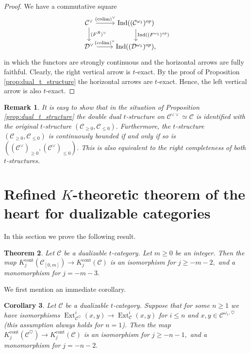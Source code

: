 \documentclass[11pt,leqno]{amsart}
\newtheorem{theo}{Theorem}[section]
\newtheorem{cor}[theo]{Corollary}
\newtheorem{remark}[theo]{Remark}
\numberwithin{equation}{section}
\DeclareMathOperator*{\colim}{colim}
\newcommand{\cont}{\operatorname{cont}}
\newcommand{\cD}{{\mathcal D}}
\newcommand{\cC}{{\mathcal C}}
\newcommand{\Ext}{\operatorname{Ext}}
\newcommand{\Ind}{\operatorname{Ind}}
\begin{document}
\begin{proof}
We have a commutative square
\begin{equation*}
\begin{tikzcd}
\cC^{\vee} \ar{r}{(\colim)^{\vee}}\ar[d, "(F^R)^{\vee}"] & \Ind((\cC^{\omega_1})^{op})\ar{d}{\Ind((F^{\omega_1})^{op})}\\
\cD^{\vee} \ar{r}{(\colim)^{\vee}} & \Ind((\cD^{\omega_1})^{op}),
\end{tikzcd}
\end{equation*}
in which the functors are strongly continuous and the horizontal arrows are fully faithful. Clearly, the right vertical arrow is $t$-exact. By the proof of Proposition \ref{prop:dual_t_structure} the horizontal arrows are $t$-exact. Hence, the left vertical arrow is also $t$-exact.
\end{proof}

\begin{remark}
It is easy to show that in the situation of Proposition \ref{prop:dual_t_structure} the double dual $t$-structure on $\cC^{\vee\vee}\simeq\cC$ is identified with the original $t$-structure $(\cC_{\geq 0},\cC_{\leq 0}).$ Furthermore, the $t$-structure $(\cC_{\geq 0},\cC_{\leq 0})$ is continuously bounded if and only if so is $((\cC^{\vee})_{\geq 0},(\cC^{\vee})_{\leq 0}).$ This is also equivalent to the right completeness of both $t$-structures.
\end{remark}

\section{Refined $K$-theoretic theorem of the heart for dualizable categories}
\label{sec:theorem_of_the_heart_for_K}

In this section we prove the following result.

\begin{theo}\label{th:theorem_of_the_heart}
Let $\cC$ be a dualizable $t$-category. Let $m\geq 0$ be an integer. Then the map $K_j^{\cont}(\cC_{[0,m]})\to K_j^{\cont}(\cC)$ is an isomorphism for $j\geq -m-2,$ and a monomorphism for $j = -m-3.$
 \end{theo}
 
 We first mention an immediate corollary.
 
 \begin{cor}\label{cor:theorem_of_the_heart_under_condition_on_Exts}
 Let $\cC$ be a dualizable $t$-category. Suppose that for some $n\geq 1$ we have isomorphisms $\Ext^i_{\cC^{\heartsuit}}(x,y)\to \Ext^i_{\cC}(x,y)$ for $i\leq n$ and $x,y\in\cC^{\omega_1,\heartsuit}$ (this assumption always holds for $n=1$). Then the map $K_j^{\cont}(\cC^{\heartsuit})\to K_j^{\cont}(\cC)$ is an isomorphism for $j\geq -n-1,$ and a monomorphism for $j = -n-2.$
 \end{cor}
 
\end{document}
